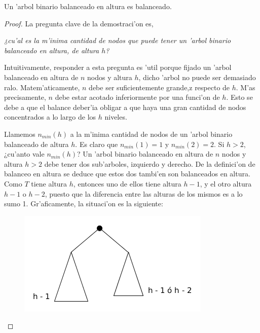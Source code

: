 \begin{teo}
	Un 'arbol binario balanceado en altura es balanceado.
	
\begin{proof}
	La pregunta clave de la demostraci'on es,
	
	\begin{center}
	\textit{¿cu'al es la m'inima cantidad de nodos que puede tener un 'arbol binario balanceado en altura, de altura $h$?}
	\end{center}
	
	Intuitivamente, responder a esta pregunta es 'util porque fijado un 'arbol balanceado en altura de $n$ nodos y altura $h$, dicho 'arbol no puede ser demasiado ralo. Matem'aticamente, $n$ debe ser suficientemente grande,z respecto de $h$. M'as precisamente, $n$ debe estar acotado inferiormente por una funci'on de $h$. Esto se debe a que el balance deber'ia obligar a que haya una gran cantidad de nodos concentrados a lo largo de los $h$ niveles.

	
	Llamemos $n_{min}(h)$ a la m'inima cantidad de nodos de un 'arbol binario balanceado de altura $h$. Es claro que $n_{min}(1) = 1$ y $n_{min}(2) = 2$. Si $h > 2$, ¿cu'anto vale $n_{min}(h)$? Un 'arbol binario balanceado en altura de $n$ nodos y altura $h > 2$ debe tener dos sub'arboles, izquierdo y derecho. De la definici'on de balanceo en altura se deduce que estos dos tambi'en son balanceados en altura. Como $T$ tiene altura $h$, entonces uno de ellos tiene altura $h - 1$, y el otro altura $h - 1$ o $h - 2$, puesto que la diferencia entre las alturas de los mismos es a lo sumo 1. Gr'aficamente, la situaci'on es la siguiente:
	
\begin{figure}[H]
	\begin{center}
	\includegraphics[scale=0.6]{imagenes/figdembh.jpg}
	\end{center}
\end{figure}


\end{proof}
\end{teo}
